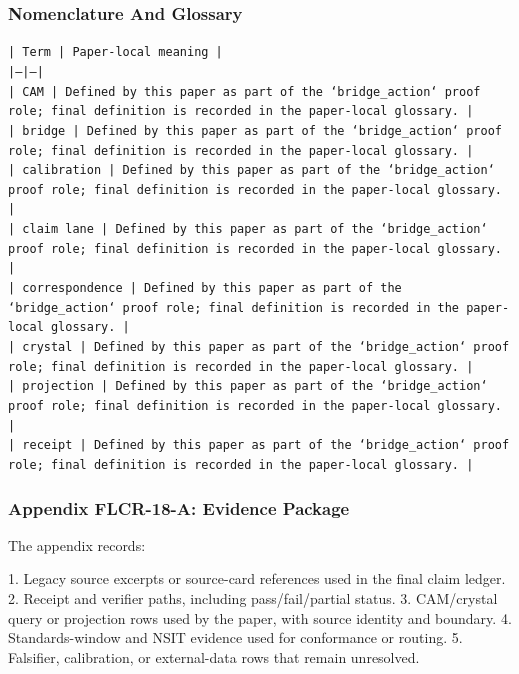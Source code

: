 \documentclass[11pt]{article}
\begin{document}
\subsubsection*{Nomenclature And Glossary}

\noindent\texttt{| Term | Paper-local meaning |}\\
\noindent\texttt{|---|---|}\\
\noindent\texttt{| CAM | Defined by this paper as part of the `bridge\_action` proof role; final definition is recorded in the paper-local glossary. |}\\
\noindent\texttt{| bridge | Defined by this paper as part of the `bridge\_action` proof role; final definition is recorded in the paper-local glossary. |}\\
\noindent\texttt{| calibration | Defined by this paper as part of the `bridge\_action` proof role; final definition is recorded in the paper-local glossary. |}\\
\noindent\texttt{| claim lane | Defined by this paper as part of the `bridge\_action` proof role; final definition is recorded in the paper-local glossary. |}\\
\noindent\texttt{| correspondence | Defined by this paper as part of the `bridge\_action` proof role; final definition is recorded in the paper-local glossary. |}\\
\noindent\texttt{| crystal | Defined by this paper as part of the `bridge\_action` proof role; final definition is recorded in the paper-local glossary. |}\\
\noindent\texttt{| projection | Defined by this paper as part of the `bridge\_action` proof role; final definition is recorded in the paper-local glossary. |}\\
\noindent\texttt{| receipt | Defined by this paper as part of the `bridge\_action` proof role; final definition is recorded in the paper-local glossary. |}\\

\subsubsection*{Appendix FLCR-18-A: Evidence Package}

The appendix records:

1. Legacy source excerpts or source-card references used in the final claim ledger.
2. Receipt and verifier paths, including pass/fail/partial status.
3. CAM/crystal query or projection rows used by the paper, with source identity and boundary.
4. Standards-window and NSIT evidence used for conformance or routing.
5. Falsifier, calibration, or external-data rows that remain unresolved.
\end{document}
